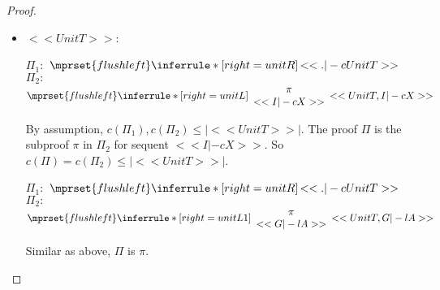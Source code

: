 \begin{proof}
\begin{enumerate}
\begin{itemize}
    \item $<<UnitT>>$:
      \begin{center}
        \scriptsize
        $\Pi_1:$
        \begin{math}
          $$\mprset{flushleft}
          \inferrule* [right={\tiny unitR}] {
            \,
          }{<<. |-c UnitT>>}
        \end{math}
        \qquad\qquad
        $\Pi_2:$
        \begin{math}
          $$\mprset{flushleft}
          \inferrule* [right={\tiny unitL}] {
            {
              \begin{array}{c}
                \pi \\
                {<<I |-c X>>}
              \end{array}
            }
          }{<<UnitT, I |-c X>>}
        \end{math}
      \end{center}
      By assumption, $c(\Pi_1),c(\Pi_2)\leq |<<UnitT>>|$. The proof $\Pi$ is the subproof $\pi$
      in $\Pi_2$ for sequent $<<I |-c X>>$. So $c(\Pi)=c(\Pi_2)\leq |<<UnitT>>|$.

      \begin{center}
        \scriptsize
        $\Pi_1:$
        \begin{math}
          $$\mprset{flushleft}
          \inferrule* [right={\tiny unitR}] {
            \,
          }{<<. |-c UnitT>>}
        \end{math}
        \qquad\qquad
        $\Pi_2:$
        \begin{math}
          $$\mprset{flushleft}
          \inferrule* [right={\tiny unitL1}] {
            {
              \begin{array}{c}
                \pi \\
                {<<G |-l A>>}
              \end{array}
            }
          }{<<UnitT, G |-l A>>}
        \end{math}
      \end{center}
      Similar as above, $\Pi$ is $\pi$.


\end{itemize}
\end{enumerate}
\end{proof}
